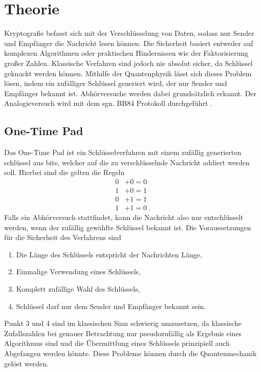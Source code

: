 \section{Theorie}
Kryptografie befasst sich mit der Verschlüsselung von Daten, sodass nur Sender und Empfänger die Nachricht lesen können. Die Sicherheit basiert entweder auf komplexen Algorithmen oder praktischen Hindernissen wie der Faktorisierung großer Zahlen. Klassische Verfahren sind jedoch nie absolut sicher, da Schlüssel geknackt werden können. Mithilfe der Quantenphysik lässt sich dieses Problem lösen, indem ein zufälliger Schlüssel generiert wird, der nur Sender und Empfänger bekannt ist. Abhörversuche werden dabei grundsätzlich erkannt.
Der Analogieversuch wird mit dem sgn. BB84 Protokoll durchgeführt \cite{bennett1984quantum}.
\subsection{One-Time Pad}
\label{sec:Blabla}
Das One-Time Pad ist ein Schlüsselverfahren mit einem zufällig generierten schlüssel aus bits, welcher auf die zu verschlüsselnde Nachricht addiert werden soll.
Hierbei sind die gelten die Regeln
\begin{align*}
    0 &+ 0 =0\\
    1 &+0 =1\\
    0&+1 =1\\
    1&+1=0\; .
\end{align*}
Falls ein Abhörversuch stattfindet, kann die Nachricht also nur entschlüsselt werden, wenn der zufällig gewählte Schlüssel bekannt ist.
Die Voraussetzungen für die Sicherheit des Verfahrens sind 
\begin{enumerate}
    \item Die Länge des Schlüssels entspricht der Nachrichten Länge,
    \item Einmalige Verwendung eines Schlüssels,
    \item Komplett zufällige Wahl des Schlüssels,
    \item Schlüssel darf nur dem Sender und Empfänger bekannt sein.
\end{enumerate}

Punkt 3 und 4 sind im klassischen Sinn schwierig umzusetzen, da klassische Zufallszahlen bei genauer Betrachtung nur pseudozufällig als Ergebnis eines Algorithmus sind und die Übermittlung eines Schlüssels prinzipiell auch Abgefangen werden könnte.
Diese Probleme können durch die Quantenmechanik gelöst werden.


